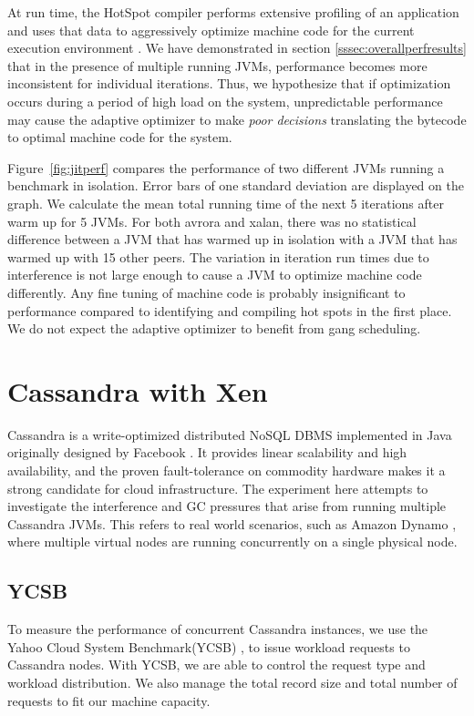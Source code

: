 \documentclass{sig-alternate}
\begin{document}
At run time, the HotSpot compiler performs extensive profiling of an application and uses that data to aggressively optimize machine code for the current execution environment \cite{hotspot:whitepaper}. We have demonstrated in section \ref{sssec:overallperfresults} that in the presence of multiple running JVMs, performance becomes more inconsistent for individual iterations. Thus, we hypothesize that if optimization occurs during a period of high load on the system, unpredictable performance may cause the adaptive optimizer to make \textit{poor decisions} translating the bytecode to optimal machine code for the system.

Figure~\ref{fig:jitperf} compares the performance of two different JVMs running a benchmark in isolation. Error bars of one standard deviation are displayed on the graph. We calculate the mean total running time of the next 5 iterations after warm up for 5 JVMs. For both avrora and xalan, there was no statistical difference between a JVM that has warmed up in isolation with a JVM that has warmed up with 15 other peers. The variation in iteration run times due to interference is not large enough to cause a JVM to optimize machine code differently. Any fine tuning of machine code is probably insignificant to performance compared to identifying and compiling hot spots in the first place. We do not expect the adaptive optimizer to benefit from gang scheduling.

\section{Cassandra with Xen} \label{sec:cassandra}

Cassandra is a write-optimized distributed NoSQL DBMS implemented in Java originally designed by Facebook \cite{lakshman2010cassandra}. It provides linear scalability and high availability, and the proven fault-tolerance on commodity hardware makes it a strong candidate for cloud infrastructure. The experiment here attempts to investigate the interference and GC pressures that arise from running multiple Cassandra JVMs. This refers to real world scenarios, such as Amazon Dynamo \cite{hastorun2007dynamo}, where multiple virtual nodes are running concurrently on a single physical node.

\subsection{YCSB}
To measure the performance of concurrent Cassandra instances, we use the Yahoo Cloud System Benchmark(YCSB) \cite{cooper2010benchmarking}, to issue workload requests to Cassandra nodes. With YCSB, we are able to control the request type and workload distribution. We also manage the total record size and total number of requests to fit our machine capacity.
\end{document}
